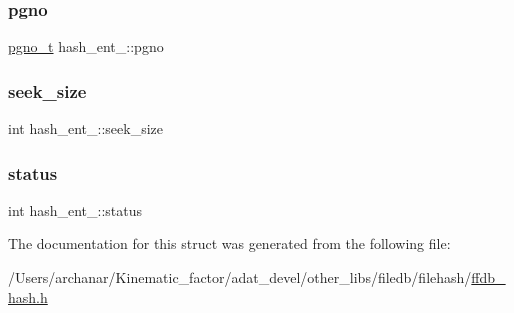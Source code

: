 \subsubsection{\texorpdfstring{pgno}{pgno}}
{\footnotesize\ttfamily \mbox{\hyperlink{other__libs_2filedb_2filehash_2ffdb__db_8h_a000813331643d38481142bcce7de1501}{pgno\+\_\+t}} hash\+\_\+ent\+\_\+\+::pgno}

\mbox{\label{structhash__ent___a8fb6b4a631c3d7a65533740791b34432}} 
\subsubsection{\texorpdfstring{seek\_size}{seek\_size}}
{\footnotesize\ttfamily int hash\+\_\+ent\+\_\+\+::seek\+\_\+size}

\mbox{\label{structhash__ent___a5ee6daeaf6c53eace7610ddcad3da4d0}} 
\subsubsection{\texorpdfstring{status}{status}}
{\footnotesize\ttfamily int hash\+\_\+ent\+\_\+\+::status}



The documentation for this struct was generated from the following file\+:\begin{DoxyCompactItemize}
\item 
/\+Users/archanar/\+Kinematic\+\_\+factor/adat\+\_\+devel/other\+\_\+libs/filedb/filehash/\mbox{\hyperlink{ffdb__hash_8h}{ffdb\+\_\+hash.\+h}}\end{DoxyCompactItemize}
